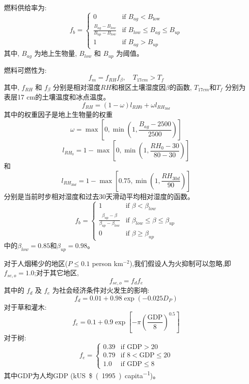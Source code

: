 燃料供给率为:
\begin{equation} 
f_b = \begin{cases} 
0 & \text{if } B_{ag} < B_{\text{low}}\\
\frac{B_{ag}-B_{low}}{B_{up}-B_{low}} & \text{if } B_{low} \leqslant B_{ag} \leqslant B_{up}\\
1 & \text{if } B_{ag} > B_{up}
\end{cases}
\end{equation}
其中, $B_{ag}$ 为地上生物量, $B_{low}$ 和 $B_{up}$ 为阈值。

燃料可燃性为: 
\begin{equation}
f_m = f_{RH} f_{\beta},\quad T_{17cm}>T_f
\end{equation}
其中, $f_{RH}$ 和 $f_{\beta}$ 分别是相对湿度$RH$和根区土壤湿度因$\beta$的函数, $T_{17cm}$和$T_{f}$ 分别为表层17 cm的土壤温度和冰点温度。
%
\begin{equation}
f_{RH} = (1-\omega)l_{RH0}+\omega l_{RH_{30d}}
\end{equation}
其中的权重因子是地上生物量的权重 $$\omega=\max\left[0, \min\left(1, \frac{B_{ag} - 2500}{2500}\right)\right]$$
$$l_{RH_0}=1-\max\left[0, \min\left(1, \frac{RH_{0} - 30}{80-30}\right)\right]$$
和
$$l_{RH_{30d}}=1-\max\left[0.75, \min\left(1, \frac{RH_{30d}}{90}\right)\right]$$
分别是当前时步相对湿度和过去30天滑动平均相对湿度的函数。
\begin{equation} 
f_b = \begin{cases} 
1 & \text{if } \beta < \beta_{low}\\
\frac{\beta_{up}-\beta}{\beta_{up}-\beta_{low}} & \text{if } \beta_{low} \leqslant \beta \leqslant \beta_{up}\\
0 & \text{if } \beta \geqslant \beta_{up}
\end{cases}
\end{equation}
中的$\beta_{low}=0.85$和$\beta_{up}=0.98$。


对于人烟稀少的地区($P \leqslant 0.1$ person km$^{-2}$),我们假设人为火抑制可以忽略,即 $f_{se,o} = 1.0$;对于其它地区, 
\begin{equation}
f_{se,o} = f_d f_e  
\end{equation}
其中的 $f_d$ 及 $f_e$ 为社会经济条件对火发生的影响:
\begin{equation}
f_d = 0.01 + 0.98\exp(-0.025 D_P)  
\end{equation}
对于草和灌木:  
\begin{equation} 
f_e = 0.1 + 0.9\exp\left[-\pi \left(\frac{\text{GDP}}{8} \right)^{0.5} \right] 
\end{equation}
%
对于树:
%
\begin{equation}
f_e = \begin{cases}
0.39 & \text{if GDP} > 20\\  
0.79 & \text{if } 8 < \text{GDP} \leqslant 20\\
1.0 & \text{if GDP} \leqslant 8  
\end{cases}
\end{equation}
%
其中GDP为人均GDP (\unit{kUS\$(1995).capita^{-1}})。



